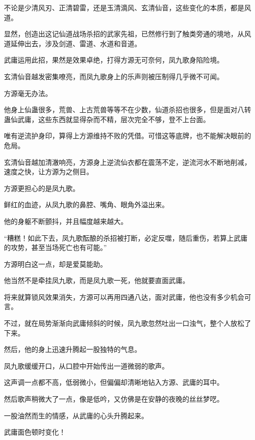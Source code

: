 
\begin{this_body}



不论是少清风刃、正清碧雷，还是玉清滴风、玄清仙音，这些变化的本质，都是风道。

显然，创造出这记仙道战场杀招的武家先祖，已然修行到了触类旁通的境地，从风道延伸出去，涉及剑道、雷道、水道和音道。

武庸运用此招，果然是效果卓绝，打得方源无可奈何，凤九歌身陷险境。

玄清仙音越发密集嘹亮，而凤九歌身上的乐声则被压制得几乎微不可闻。

方源毫无办法。

他身上仙蛊很多，荒兽、上古荒兽等等不在少数，仙道杀招也很多，但是面对八转蛊仙武庸，这些东西就显得杂而不精，层次完全不够，登不上台面。

唯有逆流护身印，算得上方源维持不败的凭借。可惜这等底牌，也不能解决眼前的危局。

玄清仙音越加清澈响亮，方源身上逆流仙衣都在震荡不定，逆流河水不断地削减，速度之快，让方源为之侧目。

方源更担心的是凤九歌。

鲜红的血迹，从凤九歌的鼻腔、嘴角、眼角外溢出来。

他的身躯不断颤抖，并且幅度越来越大。

“糟糕！如此下去，凤九歌酝酿的杀招被打断，必定反噬，随后重伤，若算上武庸的攻势，甚至当场死亡也有可能。”

方源明白这一点，却是爱莫能助。

他当然不是牵挂凤九歌，而是凤九歌一死，他就要直面武庸。

将来就算锁风效果消失，方源可以再用四通八达，面对武庸，他也没有多少机会可言。

不过，就在局势渐渐向武庸倾斜的时候，凤九歌忽然吐出一口浊气，整个人放松了下来。

然后，他的身上迅速升腾起一股独特的气息。

凤九歌缓缓开口，从口腔中开始传出一道微弱的歌声。

这声调一点都不高，低弱微小，但偏偏却清晰地钻入方源、武庸的耳中。

然后歌声稍微大了一点，像是低吟，又仿佛是在安静的夜晚的丝丝梦呓。

一股油然而生的情感，从武庸的心头升腾起来。

武庸面色顿时变化！


\end{this_body}
